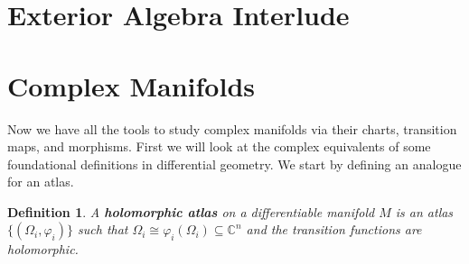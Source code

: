 \documentclass[12pt, letterpaper]{article}
\newtheorem{definition}{Definition}[section]
\newcommand{\C}{\mathbb{C}}
\newcommand{\ten}[1]{\textnormal{\textbf{#1}}}
\begin{document}
\section{Exterior Algebra Interlude}

\section{Complex Manifolds}
Now we have all the tools to study complex manifolds via their charts, transition
maps, and morphisms. First we will look at the complex equivalents of some foundational
definitions in differential geometry. We start by defining an analogue for an atlas.

\begin{definition}
    A \ten{holomorphic atlas} on a differentiable manifold $M$ is an atlas
    $\{(\Omega_i, \varphi_i)\}$ such that $\Omega_i \cong \varphi_i(\Omega_i) \subseteq
    \C^n$ and the transition functions are holomorphic.
\end{definition}

\vspace{.5cm}

\end{document}
